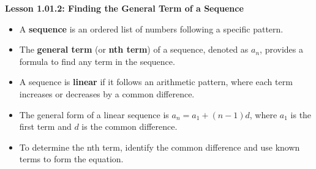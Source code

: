 \begin{center}
\textbf{Lesson 1.01.2: Finding the General Term of a Sequence}
\end{center}

\vspace*{-1.5ex}

\begin{itemize}
    \item A \textbf{sequence} is an ordered list of numbers following a specific pattern.
    \item The \textbf{general term} (or \textbf{nth term}) of a sequence, denoted as $a_n$, provides a formula to find any term in the sequence.
    \item A sequence is \textbf{linear} if it follows an arithmetic pattern, where each term increases or decreases by a common difference.
    \item The general form of a linear sequence is $a_n = a_1 + (n-1)d$, where $a_1$ is the first term and $d$ is the common difference.
    \item To determine the nth term, identify the common difference and use known terms to form the equation.
\end{itemize}